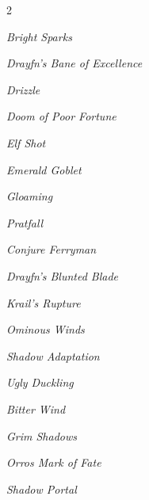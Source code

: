 \documentclass[10pt,a4paper,twoside,bg=print,twocolumn,openany,nodeprecatedcode]{dndbook}
\begin{document}
\begin{description}
\begin{multicols}{2}
{\par \vspace { 9pt plus 3pt minus 3pt } \noindent  {} \nopagebreak }

\begin{description}
\item \textit{Bright Sparks}
\item \textit{Drayfn's Bane of Excellence}
\item \textit{Drizzle}
\end{description}

{\par \vspace { 9pt plus 3pt minus 3pt } \noindent  {} \nopagebreak }

\begin{description}
\item \textit{Doom of Poor Fortune}
\item \textit{Elf Shot}
\item \textit{Emerald Goblet}
\item \textit{Gloaming}
\item \textit{Pratfall}
\end{description}

{\par \vspace { 9pt plus 3pt minus 3pt } \noindent  {} \nopagebreak }

\begin{description}
\item \textit{Conjure Ferryman}
\item \textit{Drayfn's Blunted Blade}
\item \textit{Krail's Rupture}
\item \textit{Ominous Winds}
\item \textit{Shadow Adaptation}
\item \textit{Ugly Duckling}
\end{description}

{\par \vspace { 9pt plus 3pt minus 3pt } \noindent  {} \nopagebreak }

\begin{description}
\item \textit{Bitter Wind}
\item \textit{Grim Shadows}
\item \textit{Orros Mark of Fate}
\item \textit{Shadow Portal}
\end{description}


\end{multicols}
\end{description}
\end{document}
